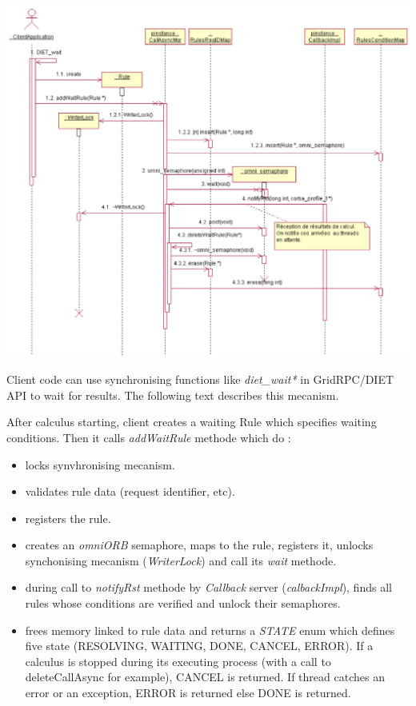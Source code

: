   \hspace{-1 in}
  \includegraphics{./fig/CallAsyncWaitSequenceDiagram.ps}

  Client code can use synchronising functions like \emph{diet\_wait*}
  in GridRPC/DIET API to wait for results. The following text describes
  this mecanism.

  After calculus starting, client creates a waiting Rule which specifies
  waiting conditions. Then it calls \emph{addWaitRule} methode which do :

  \begin{itemize}
  \item locks synvhronising mecanism.
  \item validates rule data (request identifier, etc).
  \item registers the rule.
  \item creates an \emph{omniORB}  semaphore, maps to the rule, registers it,
  unlocks synchonising mecanism (\emph{WriterLock}) and call its \emph{wait} methode.
  \item during call to \emph{notifyRst} methode by \emph{Callback} server 
  (\emph{calbackImpl}), finds all rules whose conditions are verified
  and unlock their semaphores.
  \item frees memory linked to rule data and returns a \emph{STATE} enum 
  which defines five state (RESOLVING, WAITING, DONE, CANCEL, ERROR). If
  a calculus is stopped during its executing process (with a call to deleteCallAsync for example),
  CANCEL is returned. If thread catches an error or an exception, ERROR is returned else DONE is returned.
  \end{itemize}


